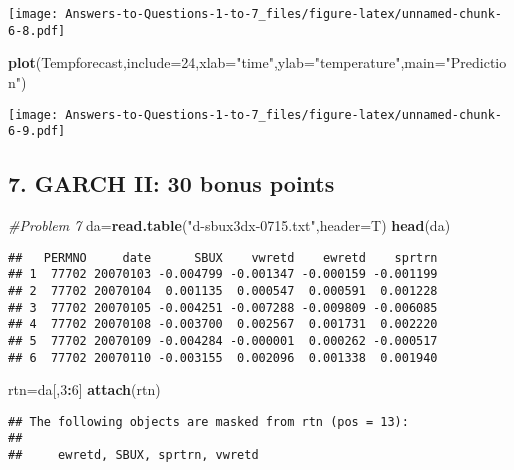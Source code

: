 \documentclass[
]{article}
\newenvironment{Shaded}{\begin{snugshade}}{\end{snugshade}}
\newcommand{\AttributeTok}[1]{\textcolor[rgb]{0.13,0.29,0.53}{#1}}
\newcommand{\CommentTok}[1]{\textcolor[rgb]{0.56,0.35,0.01}{\textit{#1}}}
\newcommand{\DecValTok}[1]{\textcolor[rgb]{0.00,0.00,0.81}{#1}}
\newcommand{\FunctionTok}[1]{\textcolor[rgb]{0.13,0.29,0.53}{\textbf{#1}}}
\newcommand{\NormalTok}[1]{#1}
\newcommand{\OtherTok}[1]{\textcolor[rgb]{0.56,0.35,0.01}{#1}}
\newcommand{\SpecialCharTok}[1]{\textcolor[rgb]{0.81,0.36,0.00}{\textbf{#1}}}
\newcommand{\StringTok}[1]{\textcolor[rgb]{0.31,0.60,0.02}{#1}}
\begin{document}
\texttt{[image: Answers-to-Questions-1-to-7\_files/figure-latex/unnamed-chunk-6-8.pdf]}

\begin{Shaded}
\begin{Highlighting}[]
\FunctionTok{plot}\NormalTok{(Tempforecast,}\AttributeTok{include=}\DecValTok{24}\NormalTok{,}\AttributeTok{xlab=}\StringTok{"time"}\NormalTok{,}\AttributeTok{ylab=}\StringTok{"temperature"}\NormalTok{,}\AttributeTok{main=}\StringTok{"Prediction"}\NormalTok{)}
\end{Highlighting}
\end{Shaded}

\texttt{[image: Answers-to-Questions-1-to-7\_files/figure-latex/unnamed-chunk-6-9.pdf]}

\subsection{7. GARCH II: 30 bonus
points}\label{garch-ii-30-bonus-points}

\begin{Shaded}
\begin{Highlighting}[]
\CommentTok{\#Problem 7}
\NormalTok{da}\OtherTok{=}\FunctionTok{read.table}\NormalTok{(}\StringTok{"d{-}sbux3dx{-}0715.txt"}\NormalTok{,}\AttributeTok{header=}\NormalTok{T)}
\FunctionTok{head}\NormalTok{(da)}
\end{Highlighting}
\end{Shaded}

\begin{verbatim}
##   PERMNO     date      SBUX    vwretd    ewretd    sprtrn
## 1  77702 20070103 -0.004799 -0.001347 -0.000159 -0.001199
## 2  77702 20070104  0.001135  0.000547  0.000591  0.001228
## 3  77702 20070105 -0.004251 -0.007288 -0.009809 -0.006085
## 4  77702 20070108 -0.003700  0.002567  0.001731  0.002220
## 5  77702 20070109 -0.004284 -0.000001  0.000262 -0.000517
## 6  77702 20070110 -0.003155  0.002096  0.001338  0.001940
\end{verbatim}

\begin{Shaded}
\begin{Highlighting}[]
\NormalTok{rtn}\OtherTok{=}\NormalTok{da[,}\DecValTok{3}\SpecialCharTok{:}\DecValTok{6}\NormalTok{]}
\FunctionTok{attach}\NormalTok{(rtn)}
\end{Highlighting}
\end{Shaded}

\begin{verbatim}
## The following objects are masked from rtn (pos = 13):
## 
##     ewretd, SBUX, sprtrn, vwretd
\end{verbatim}
\end{document}
